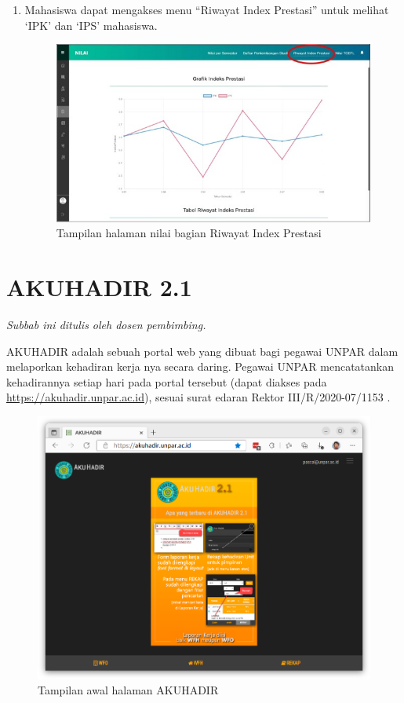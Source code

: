\begin{enumerate}
\begin{enumerate}
\begin{figure}[H]
			\label{fig:nilai_2018}
		\end{figure}
		\item Mahasiswa dapat mengakses menu ``Riwayat Index Prestasi'' untuk melihat `IPK' dan `IPS' mahasiswa.
		\begin{figure}[H]
			\centering
			\includegraphics[scale=0.7]{Gambar/rip2018.jpg}
			\caption{Tampilan halaman nilai bagian Riwayat Index Prestasi} 
			\label{fig:rip_2018}
		\end{figure}
	\end{enumerate}	
\end{enumerate}
\newpage

\section{AKUHADIR 2.1}
\label{sec:akuhadir}
\textit{Subbab ini ditulis oleh dosen pembimbing.}

AKUHADIR adalah sebuah portal web yang dibuat bagi pegawai UNPAR dalam melaporkan kehadiran kerja nya secara daring. Pegawai UNPAR mencatatankan kehadirannya setiap hari pada portal tersebut (dapat diakses pada \url{https://akuhadir.unpar.ac.id}), sesuai surat edaran Rektor III/R/2020-07/1153 \cite{akuhadir}.

\begin{figure}[H]
	\centering
	\includegraphics[scale=0.25]{Gambar/akuhadir-1-beranda.png}
	\caption{Tampilan awal halaman AKUHADIR} 
	\label{fig:akuhadir-1-beranda}
\end{figure}

